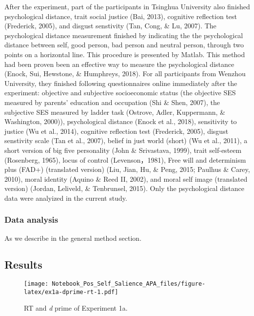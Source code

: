 \documentclass[man]{apa6}
\begin{document}
After the experiment, part of the participants in Tsinghua University also finished psychological distance, trait social justice (Bai, 2013), cognitive reflection test (Frederick, 2005), and disgust senstivity (Tan, Cong, \& Lu, 2007). The psychological distance measurement finished by indicating the the psychological distance between self, good person, bad person and neutral person, through two points on a horizontal line. This procedure is presented by Matlab. This method had been proven been an effective way to measure the psychological distance (Enock, Sui, Hewstone, \& Humphreys, 2018).
For all participants from Wenzhou University, they finished following questionnaires online immediately after the experiment: objective and subjective socioeconomic status (the objective SES measured by parents' education and occupation (Shi \& Shen, 2007), the subjective SES measured by ladder task (Ostrove, Adler, Kuppermann, \& Washington, 2000)), psychological distance (Enock et al., 2018), sensitivity to justice (Wu et al., 2014), cognitive reflection test (Frederick, 2005), disgust senstivity scale (Tan et al., 2007), belief in just world (short) (Wu et al., 2011), a short version of big five personality (John \& Srivastava, 1999), trait self-esteem (Rosenberg, 1965), locus of control (Levenson，1981), Free will and determinism plus (FAD+) (translated version) (Liu, Jian, Hu, \& Peng, 2015; Paulhus \& Carey, 2010), moral identity (Aquino \& Reed II, 2002), and moral self image (translated version) (Jordan, Leliveld, \& Tenbrunsel, 2015). Only the psychological distance data were analyized in the current study.

\hypertarget{data-analysis-1}{%
\subsubsection{Data analysis}\label{data-analysis-1}}

As we describe in the general method section.

\hypertarget{results}{%
\subsection{Results}\label{results}}

\begin{figure}
\centering
\texttt{[image: Notebook\_Pos\_Self\_Salience\_APA\_files/figure-latex/ex1a-dprime-rt-1.pdf]}
\caption{\label{fig:ex1a-dprime-rt}RT and \emph{d} prime of Experiment 1a.}
\end{figure}
\end{document}
